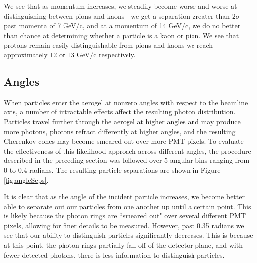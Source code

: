 We see that as momentum increases, we steadily become worse and worse at distinguishing between pions and kaons - we get a separation greater than $2 \sigma$ past momenta of 7 GeV/c, and at a momentum of 14 GeV/c, we do no better than chance at determining whether a particle is a kaon or pion.
We see that protons remain easily distinguishable from pions and kaons we reach approximately 12 or 13 GeV/c respectively. 

\subsection{Angles}
When particles enter the aerogel at nonzero angles with respect to the beamline axis, a number of intractable effects affect the resulting photon distribution. 
Particles travel further through the aerogel at higher angles and may produce more photons, photons refract differently at higher angles, and the resulting Cherenkov cones may become smeared out over more PMT pixels. 
To evaluate the effectiveness of this likelihood approach across different angles, the procedure described in the preceding section was followed over 5 angular bins ranging from 0 to 0.4 radians.
The resulting particle separations are shown in Figure \ref{fig:angleSeps}.

It is clear that as the angle of the incident particle increases, we become better able to separate out our particles from one another up until a certain point.
This is likely because the photon rings are ``smeared out" over several different PMT pixels, allowing for finer details to be measured. 
However, past 0.35 radians we see that our ability to distinguish particles significantly decreases.
This is because at this point, the photon rings partially fall off of the detector plane, and with fewer detected photons, there is less information to distinguish particles.

